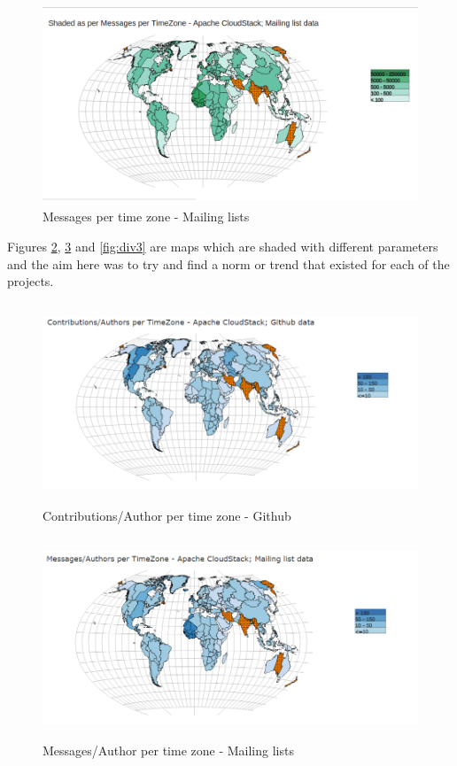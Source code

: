 \documentclass[double,12pt]{beavtex}
\begin{document}
\begin{figure}[H]
\centering
\includegraphics[width=130mm,height=60mm]{image7.png}
\caption{Messages per time zone - Mailing lists}
\label{fig:mgML}
\end{figure}

Figures \ref{fig:div1}, \ref{fig:div2} and \ref{fig:div3} are maps which are shaded with different parameters and the aim here was to try and find a norm or trend that existed for each of the projects.

\begin{figure}[H]
\centering
\includegraphics[width=130mm,height=60mm]{image8.PNG}
\caption{Contributions/Author per time zone - Github}
\label{fig:div1}
\end{figure}

\begin{figure}[H]
\centering
\includegraphics[width=130mm,height=60mm]{image9.PNG}
\caption{Messages/Author per time zone - Mailing lists}
\label{fig:div2}
\end{figure}
\end{document}
